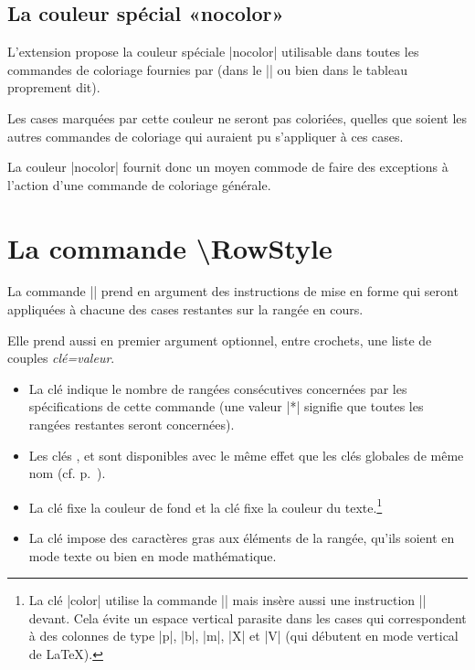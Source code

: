 \documentclass[dvipsnames]{article}%
\begin{document}
\subsection{La couleur spécial «nocolor»}


L'extension  propose la couleur spéciale |nocolor| utilisable
dans toutes les commandes de coloriage fournies par  (dans le
|\CodeBefore| ou bien dans le tableau proprement dit).

Les cases marquées par cette couleur ne seront pas coloriées, quelles que soient
les autres commandes de coloriage qui auraient pu s'appliquer à ces cases. 

La couleur |nocolor| fournit donc un moyen commode de faire des exceptions à
l'action d'une commande de coloriage générale.


\section{La commande \textbackslash RowStyle}

\label{RowStyle}


La commande |\RowStyle| prend en argument des instructions de mise en forme qui
seront appliquées à chacune des cases restantes sur la rangée en cours.

\medskip
Elle prend aussi en premier argument optionnel, entre crochets, une liste de
couples \textsl{clé=valeur}.
\begin{itemize}
\item {}
La clé  indique le nombre de rangées consécutives concernées par
les spécifications de cette commande (une valeur |*| signifie que toutes les
rangées restantes seront concernées).
\item Les clés , 
et  sont disponibles avec le même effet que les
clés globales de même nom (cf. p.~\pageref{cell-space}).

\item 
{}
La clé  fixe la couleur de fond et la clé 
fixe la couleur du texte.\footnote{La clé |color| utilise la commande |\color| mais
  insère aussi une instruction |\leavevmode| devant. Cela évite un espace
  vertical parasite dans les cases qui correspondent à des colonnes de type
  |p|, |b|, |m|, |X| et |V| (qui débutent en mode vertical de LaTeX).}

\item {}
La clé  impose des caractères gras aux éléments de la rangée, qu'ils
soient en mode texte ou bien en mode mathématique.
\end{itemize}
\end{document}
